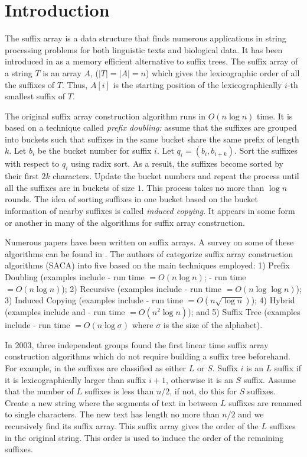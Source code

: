 \section{Introduction}

The suffix array is a data structure that finds numerous applications in string
processing problems for both linguistic texts and biological data. It has been
introduced in \cite{MaMy93} as a memory efficient alternative to suffix trees. 
The suffix array of
a string $T$ is an array $A$, ($|T|=|A|=n$) which gives the lexicographic order
of all the suffixes of $T$. Thus, $A[i]$ is the starting position of
the lexicographically $i$-th smallest suffix of $T$.

The original suffix array construction
algorithm \cite{MaMy93} runs in $O(n\log n)$ time. It
is based on a technique called {\em prefix doubling:} assume that the suffixes
are grouped into buckets such that suffixes 
in the same bucket share
the same prefix of length $k$. Let $b_i$ be the bucket
number for suffix $i$. Let $q_i=(b_i, b_{i+k})$. Sort the suffixes with
respect to $q_i$ using radix sort. As a result, the suffixes become sorted by their first $2k$
characters. Update the bucket numbers and repeat the process until all the
suffixes are in buckets of size $1$. This process takes no more than $\log n$
rounds.
The idea of sorting suffixes in one bucket based on the bucket
information of nearby suffixes is called {\em induced copying}. It appears in some form or
another in many of the algorithms for suffix array
construction.

Numerous papers have been written on suffix arrays. A survey
on some of these algorithms can be found in \cite{PST2007}. The authors of
\cite{PST2007} categorize suffix array construction algorithms  (SACA) into
five based on the main techniques employed: 1) Prefix Doubling (examples include
\cite{MaMy93} - run time  $=O(n\log n)$; \cite{LaSa99} - run time $=O(n\log
n)$); 2) Recursive (examples include \cite{KJP04} - run time $=O(n\log\log
n)$); 3) Induced Copying (examples include  \cite{BaBr05} - run time $=O(n\sqrt{\log n})$); 
4) Hybrid (examples
include \cite{ItTa99} and \cite{KoAl03} - run time $=O(n^2\log n)$); and 5)
Suffix Tree (examples include \cite{Kur99} - run time $=O(n\log \sigma)$ where
$\sigma$ is the size of the alphabet).

In 2003, three independent groups \cite{KoAl03,KaSa03,KSP+03} found the first
linear time suffix array construction algorithms which do not require building a
suffix tree beforehand. For example, in \cite{KoAl03} the suffixes
are classified as either $L$ or $S$. Suffix $i$ is an $L$ suffix if it is lexicographically larger than
suffix $i+1$, otherwise it is an $S$ suffix. Assume that the number of $L$
suffixes is less than $n/2$, if not, do this for $S$ suffixes. Create a new
string where the segments of text in between $L$ suffixes are renamed
to single characters. The new text has length no more than $n/2$ 
and we recursively find its suffix array. This suffix array gives the order of 
the $L$ suffixes in the original string. This order is used to induce the order 
of the remaining suffixes.

